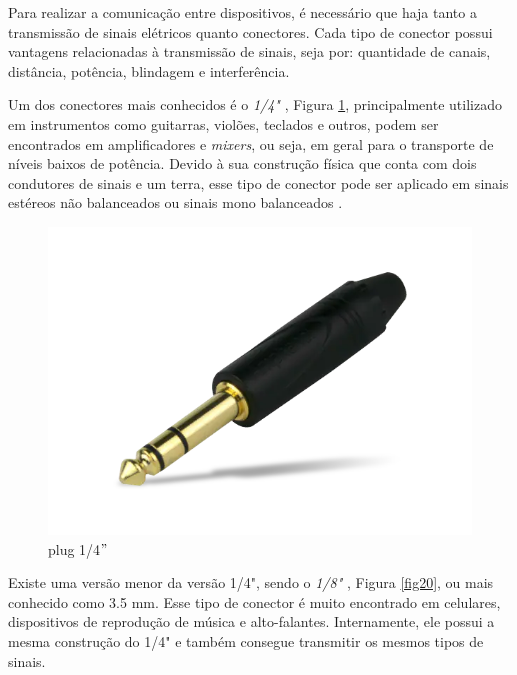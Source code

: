 Para realizar a comunicação entre dispositivos, é necessário que haja tanto a transmissão de sinais elétricos quanto conectores. Cada tipo de conector possui vantagens relacionadas à transmissão de sinais, seja por: quantidade de canais, distância, potência, blindagem e interferência.

Um dos conectores mais conhecidos é o \textit{1/4"} , Figura \ref{fig19}, principalmente utilizado em instrumentos como guitarras, violões, teclados e outros, podem ser encontrados em amplificadores e \textit{mixers}, ou seja, em geral para o transporte de níveis baixos de potência. Devido à sua construção física que conta com dois condutores de sinais e um terra, esse tipo de conector pode ser aplicado em sinais estéreos não balanceados ou sinais mono balanceados \cite{bartlett}.

\begin{figure}[h]
	\centering
    \includegraphics[scale=0.2]{figuras/fig19.png}
	\caption{plug 1/4$"$ \cite{mouser}}
	\label{fig19}
\end{figure}

Existe uma versão menor da versão 1/4", sendo o \textit{1/8"} , Figura \ref{fig20}, ou mais conhecido como 3.5 mm. Esse tipo de conector é muito encontrado em celulares, dispositivos de reprodução de música e alto-falantes. Internamente, ele possui a mesma construção do 1/4" e também consegue transmitir os mesmos tipos de sinais.

